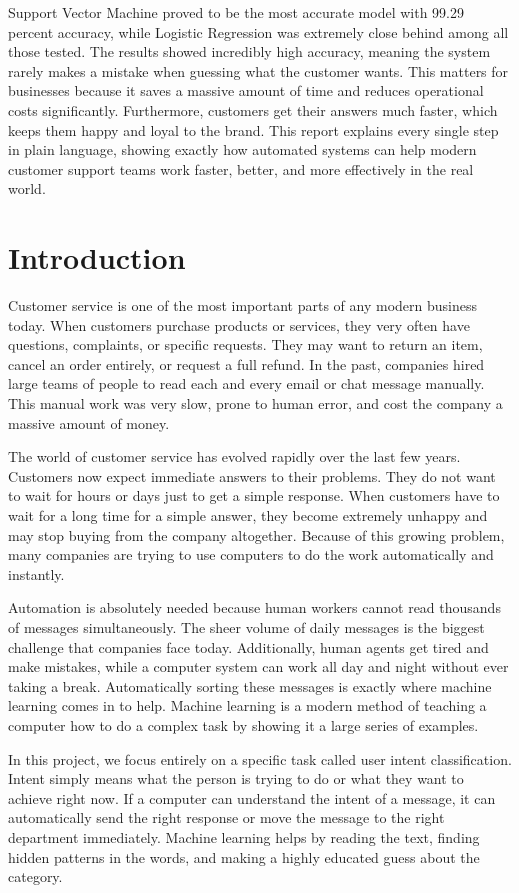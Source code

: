 \documentclass[12pt]{article}
\begin{document}
Support Vector Machine proved to be the most accurate model with 99.29 percent accuracy, while Logistic Regression was extremely close behind among all those tested. The results showed incredibly high accuracy, meaning the system rarely makes a mistake when guessing what the customer wants. This matters for businesses because it saves a massive amount of time and reduces operational costs significantly. Furthermore, customers get their answers much faster, which keeps them happy and loyal to the brand. This report explains every single step in plain language, showing exactly how automated systems can help modern customer support teams work faster, better, and more effectively in the real world.

\section{Introduction}
Customer service is one of the most important parts of any modern business today. When customers purchase products or services, they very often have questions, complaints, or specific requests. They may want to return an item, cancel an order entirely, or request a full refund. In the past, companies hired large teams of people to read each and every email or chat message manually. This manual work was very slow, prone to human error, and cost the company a massive amount of money. 

The world of customer service has evolved rapidly over the last few years. Customers now expect immediate answers to their problems. They do not want to wait for hours or days just to get a simple response. When customers have to wait for a long time for a simple answer, they become extremely unhappy and may stop buying from the company altogether. Because of this growing problem, many companies are trying to use computers to do the work automatically and instantly. 

Automation is absolutely needed because human workers cannot read thousands of messages simultaneously. The sheer volume of daily messages is the biggest challenge that companies face today. Additionally, human agents get tired and make mistakes, while a computer system can work all day and night without ever taking a break. Automatically sorting these messages is exactly where machine learning comes in to help. Machine learning is a modern method of teaching a computer how to do a complex task by showing it a large series of examples. 

In this project, we focus entirely on a specific task called user intent classification. Intent simply means what the person is trying to do or what they want to achieve right now. If a computer can understand the intent of a message, it can automatically send the right response or move the message to the right department immediately. Machine learning helps by reading the text, finding hidden patterns in the words, and making a highly educated guess about the category. 
\end{document}
